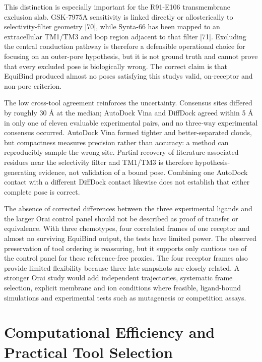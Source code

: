 This distinction is especially important for the R91-E106 transmembrane exclusion slab. GSK-7975A sensitivity is linked directly or allosterically to selectivity-filter geometry {[}70{]}, while Synta-66 has been mapped to an extracellular TM1/TM3 and loop region adjacent to that filter {[}71{]}. Excluding the central conduction pathway is therefore a defensible operational choice for focusing on an outer-pore hypothesis, but it is not ground truth and cannot prove that every excluded pose is biologically wrong. The correct claim is that EquiBind produced almost no poses satisfying this study\textquotesingle s valid, on-receptor and non-pore criterion.

The low cross-tool agreement reinforces the uncertainty. Consensus sites differed by roughly 30 Å at the median; AutoDock Vina and DiffDock agreed within 5 Å in only one of eleven evaluable experimental pairs, and no three-way experimental consensus occurred. AutoDock Vina formed tighter and better-separated clouds, but compactness measures precision rather than accuracy: a method can reproducibly sample the wrong site. Partial recovery of literature-associated residues near the selectivity filter and TM1/TM3 is therefore hypothesis-generating evidence, not validation of a bound pose. Combining one AutoDock contact with a different DiffDock contact likewise does not establish that either complete pose is correct.

The absence of corrected differences between the three experimental ligands and the larger Orai control panel should not be described as proof of transfer or equivalence. With three chemotypes, four correlated frames of one receptor and almost no surviving EquiBind output, the tests have limited power. The observed preservation of tool ordering is reassuring, but it supports only cautious use of the control panel for these reference-free proxies. The four receptor frames also provide limited flexibility because three late snapshots are closely related. A stronger Orai study would add independent trajectories, systematic frame selection, explicit membrane and ion conditions where feasible, ligand-bound simulations and experimental tests such as mutagenesis or competition assays.

\hypertarget{computational-efficiency-and-practical-tool-selection}{%
\section{Computational Efficiency and Practical Tool Selection}\label{computational-efficiency-and-practical-tool-selection}}

